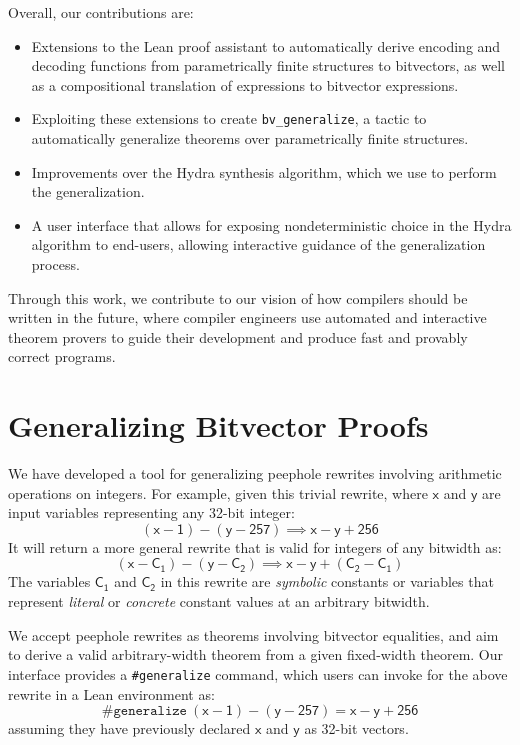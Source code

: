 \documentclass[review, anonymous, acmsmall]{acmart}
\newcommand{\bvgeneralize}{\texttt{bv\_generalize}}
\newcommand{\blockmath}[1]{\[\mathsf{#1}\]}
\newcommand{\inline}[1]{$\mathsf{#1}$}
\begin{document}
Overall, our contributions are:
\begin{itemize}
	\item Extensions to the Lean proof assistant to automatically derive encoding
    and decoding functions from parametrically finite structures to bitvectors,
    as well as a compositional translation of expressions to bitvector
    expressions.
	\item Exploiting these extensions to create \bvgeneralize,
    a tactic to automatically generalize theorems over parametrically finite structures.
	\item Improvements over the Hydra synthesis algorithm,
    which we use to perform the generalization.
  \item A user interface that allows for exposing nondeterministic choice in the
    Hydra algorithm to end-users, allowing interactive guidance of the
    generalization process.
\end{itemize}


Through this work, we contribute to our vision of how compilers should be written in the future, where compiler engineers use automated and interactive theorem provers to guide their development and produce fast and provably correct programs.

\section{Generalizing Bitvector Proofs}

We have developed a tool for generalizing peephole rewrites involving arithmetic operations on integers. For example, given this trivial rewrite, where \inline{x} and \inline{y} are input variables representing any 32-bit integer:
\blockmath{(x - 1) - (y - 257) \implies x - y + 256}
It will return a more general rewrite that is valid for integers of any bitwidth as:  
\blockmath{(x - C_1) - (y - C_2) \implies x - y + (C_2 - C_1)}
The variables \inline{C_1} and \inline{C_2} in this rewrite are \textit{symbolic} constants or variables that represent \textit{literal} or \textit{concrete} constant values at an arbitrary bitwidth. 

We accept peephole rewrites as theorems involving bitvector equalities, and aim to derive a valid arbitrary-width theorem from a given fixed-width theorem. Our interface provides a \texttt{\#generalize} command, which users can invoke for the above rewrite in a Lean environment as:
\blockmath{\texttt{\#generalize}\ (x - 1) - (y - 257) = x - y + 256}
assuming they have previously declared \inline{x} and \inline{y} as 32-bit vectors.
\end{document}
